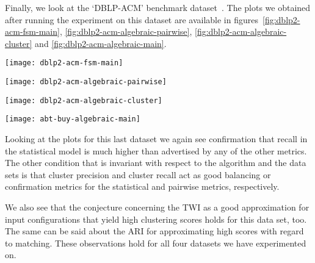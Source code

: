 Finally, we look at the `DBLP-ACM' benchmark dataset~\cite{vldb2010}.
The plots we obtained after running the experiment on this dataset are available
in figures~\ref{fig:dblp2-acm-fsm-main},
\ref{fig:dblp2-acm-algebraic-pairwise},
\ref{fig:dblp2-acm-algebraic-cluster} and
\ref{fig:dblp2-acm-algebraic-main}.

\begin{figure*}[h]
    \begin{minipage}{0.24\textwidth}
        \centering
        \texttt{[image: dblp2-acm-fsm-main]}
        \caption{DBLP-ACM statistical metrics.}
        \label{fig:dblp2-acm-fsm-main}
    \end{minipage}
    \begin{minipage}{0.24\textwidth}
        \centering
        \texttt{[image: dblp2-acm-algebraic-pairwise]}
        \caption{DBLP-ACM pairwise metrics.}
        \label{fig:dblp2-acm-algebraic-pairwise}
    \end{minipage}
    \begin{minipage}{0.24\textwidth}
        \centering
        \texttt{[image: dblp2-acm-algebraic-cluster]}
        \caption{DBLP-ACM cluster metrics.}
        \label{fig:dblp2-acm-algebraic-cluster}
    \end{minipage}
    \begin{minipage}{0.24\textwidth}
        \centering
        \texttt{[image: abt-buy-algebraic-main]}
        \caption{DBLP-ACM clustering indexes.}
        \label{fig:dblp2-acm-algebraic-main}
    \end{minipage}
\end{figure*}\label{dblp2-acm}

Looking at the plots for this last dataset we again see confirmation that recall
in the statistical model is much higher than advertised by any of the other
metrics.
The other condition that is invariant with respect to the algorithm and the
data sets is that cluster precision and cluster recall act as good balancing or
confirmation metrics for the statistical and pairwise metrics, respectively.

We also see that the conjecture concerning the TWI as a good approximation for
input configurations that yield high clustering scores holds for this data set,
too.
The same can be said about the ARI for approximating high scores with regard to
matching.
These observations hold for all four datasets we have experimented on.